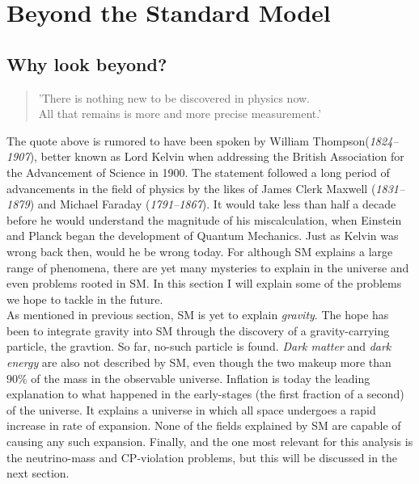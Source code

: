 \section{Beyond the Standard Model}
\subsection{Why look beyond?}
\begin{center}
    \hyphenblockcquote{UKenglish}{Kelvin}{
        'There is nothing new to be discovered in physics now.\\
        All that remains is more and more precise measurement.'
        }
\end{center}
The quote above is rumored to have been spoken by William Thompson(\emph{1824–1907}), better
known as Lord Kelvin when addressing the British Association for the Advancement
of Science in 1900. The statement followed a long period of advancements in the
field of physics by the likes of James Clerk Maxwell (\emph{1831–1879}) and 
Michael Faraday (\emph{1791–1867}). It would take less than half a decade
before he would understand the magnitude of his miscalculation, when Einstein and 
Planck began the development of Quantum Mechanics. Just as Kelvin was wrong back then, 
would he be wrong today. For although \ac{SM} explains a large range of phenomena,
there are yet many mysteries to explain in the universe and even problems rooted in \ac{SM}.
In this section I will explain some of the problems we hope to tackle in the future. 
\\ \newline
As mentioned in previous section, \ac{SM} is yet to explain \emph{gravity}. The hope has been
to integrate gravity into \ac{SM} through the discovery of a gravity-carrying particle, 
the gravtion. So far, no-such particle is found. \emph{Dark matter} and \emph{dark energy} are 
also not described by \ac{SM}, even though the two makeup more than $90\%$ of the mass in the 
observable universe. Inflation is today the leading explanation to what happened in the early-stages
(the first fraction of a second) of the universe. It explains a universe in which all space
undergoes a rapid increase in rate of expansion. None of the fields explained by \ac{SM} are 
capable of causing any such expansion. Finally, and the one most relevant for this analysis is the
neutrino-mass and \ac{CP}-violation problems, but this will be discussed in the next section.
